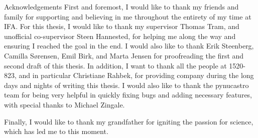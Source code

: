 


\begin{multiabstract}{Acknowledgements} 
\noindent First and foremost, I would like to thank my friends and family for supporting and believing in me throughout the entirety of my time at IFA. For this thesis, I would like to thank my supervisor Thomas Tram, and unofficial co-supervisor Steen Hannested, for helping me along the way and ensuring I reached the goal in the end. I would also like to thank Erik Steenberg, Camilla Sørensen, Emil Birk, and Marta Jensen for proofreading the first and second draft of this thesis. In addition, I want to thank all the people at 1520-823, and in particular Christiane Rahbek, for providing company during the long days and nights of writing this thesis. I would also like to thank the pynucastro team for being very helpful in quickly fixing bugs and adding necessary features, with special thanks to Michael Zingale. 

Finally, I would like to thank my grandfather for igniting the passion for science, which has led me to this moment.

\end{multiabstract}
